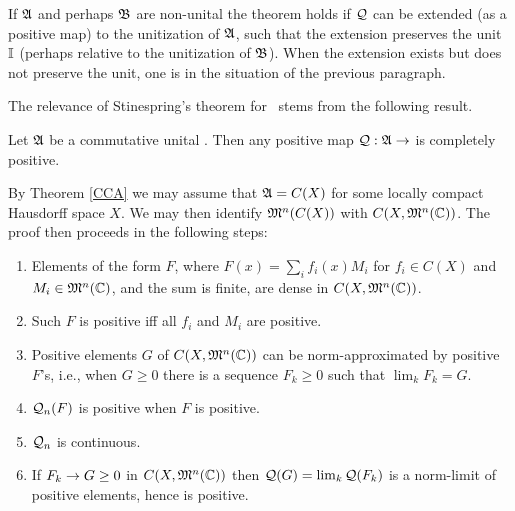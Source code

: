 If ${\frak A}$ and perhaps ${\frak B}$ are non-unital the theorem holds if ${\cal Q}$ can
be extended (as a positive map) to the unitization of ${\frak A}$, such that
the extension preserves the unit ${\Bbb I}$ (perhaps relative to the
unitization of ${\frak B}$).  When the extension exists but does not preserve
the unit, one is in the situation of the previous paragraph.

The relevance of Stinespring's theorem for \qm\ stems from the
following result.
\begin{Proposition}
Let ${\frak A}$ be a commutative unital \ca. Then any positive map
${\cal Q}:{\frak A}\rightarrow$ is completely positive.
\end{Proposition}

By Theorem \ref{CCA} we may assume that ${\frak A}=C(X)$ for some locally
compact Hausdorff space $X$. We may then identify ${\frak M}^n(C(X))$ with
$C(X,{\frak M}^n({\Bbb C}))$.  The proof then proceeds in the following steps:
\begin{enumerate}
\item
Elements of the form $F$, where $F(x)=\sum_i f_i (x)M_i$ for $f_i\in
C(X)$ and $M_i\in {\frak M}^n({\Bbb C})$, and the sum is finite, are dense in
$C(X,{\frak M}^n({\Bbb C}))$.
\item
Such $F$ is positive iff all $f_i$ and $M_i$ are positive.
\item 
Positive elements $G$ of $C(X,{\frak M}^n({\Bbb C}))$ can be norm-approximated by
positive $F$'s, i.e., when $G\geq 0$ there is a sequence $F_k\geq 0$
such that $\lim_k F_k=G$.
\item
${\cal Q}_n(F)$ is positive when $F$ is positive.
\item
${\cal Q}_n$ is continuous.
\item
If $F_k\rightarrow G\geq 0$ in $C(X,{\frak M}^n({\Bbb C}))$ then ${\cal Q}(G)=\lim_k {\cal Q}(F_k)$
is a norm-limit of positive elements, hence is positive.
\end{enumerate}


